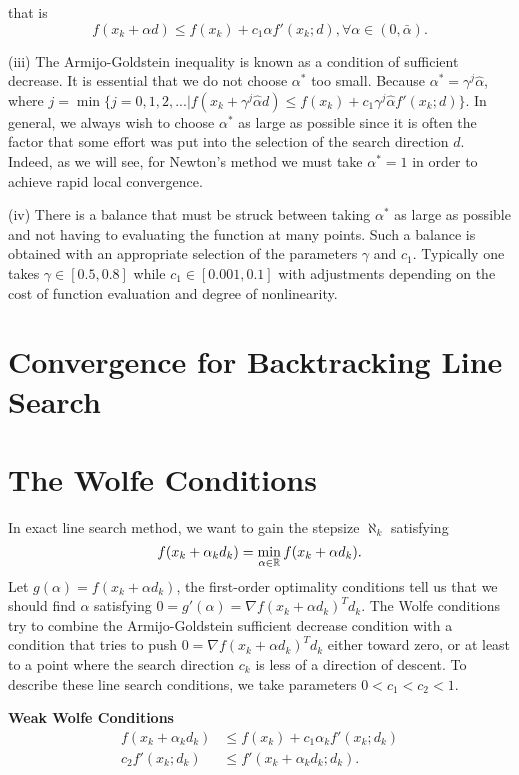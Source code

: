 that is 
\begin{equation*}
    f(x_k+\alpha d)\leq f(x_k) + c_1\alpha f'(x_k;d),\forall \alpha \in (0,\bar{\alpha}).
\end{equation*}
\par
(iii) The Armijo-Goldstein inequality is known as a condition of sufficient decrease. It is
essential that we do not choose $\alpha^*$ too small. Because $\alpha^*=\gamma^j \hat{\alpha}$, where $j=\min\{j=0,1,2,...|f(x_k+\gamma^j \hat{\alpha} d)\leq f(x_k) + c_1\gamma^j \hat{\alpha} f'(x_k;d)\}$. 
In general, we always wish to choose $\alpha^*$ as large as possible since it is often the factor that some effort was put into the selection of the
search direction $d$. Indeed, as we will see, for Newton's method we must take $\alpha^*=1$ in order to achieve rapid local convergence.
\par
(iv) There is a balance that must be struck between taking $\alpha^*$ as large as possible and not
having to evaluating the function at many points. Such a balance is obtained with
an appropriate selection of the parameters $\gamma$ and $c_1$. Typically one takes $\gamma \in [0.5, 0.8]$
while $c_1 \in [0.001, 0.1]$ with adjustments depending on the cost of function evaluation
and degree of nonlinearity.

\section{Convergence for Backtracking Line Search}

\section{The Wolfe Conditions}
In exact line search method, we want to gain the stepsize $\aleph_k$ satisfying 
\begin{equation*}
    f(x_k+\alpha_k d_k) = \min_{\alpha\in \mathbb{R}}f(x_k+\alpha d_k).
\end{equation*} 
Let $g(\alpha)=f(x_k+\alpha d_k)$, the first-order optimality conditions tell us that we should find $\alpha$ satisfying $0=g'(\alpha)=\nabla f(x_k+\alpha d_k)^Td_k$. The
Wolfe conditions try to combine the Armijo-Goldstein sufficient decrease condition with a
condition that tries to push $0=\nabla f(x_k+\alpha d_k)^Td_k$ either toward zero, or at least to a point
where the search direction $c_k$ is less of a direction of descent. To describe these line search
conditions, we take parameters $0<c_1<c_2<1$. 
\par
\noindent \textbf{Weak Wolfe Conditions}
\begin{subequations}
    \begin{align}
        f(x_k+\alpha_k d_k) &\leq f(x_k)+c_1\alpha_kf'(x_k;d_k)\label{eq:Weak Wolfe Conditions a}\\
        c_2f'(x_k;d_k)&\leq f'(x_k+\alpha_kd_k;d_k).\label{eq:Weak Wolfe Conditions b}
    \end{align}
    \end{subequations}


